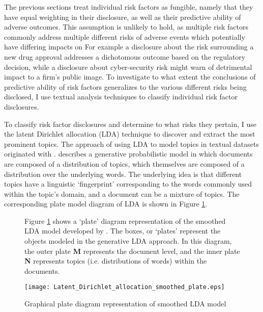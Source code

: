 The previous sections treat individual risk factors as fungible, namely that they have equal weighting in their disclosure, as well as their predictive ability of adverse outcomes.
This assumption is unlikely to hold, as multiple risk factors commonly address multiple different risks of adverse events which potentially have differing impacts on 
For example a disclosure about the risk surrounding a new drug approval addresses a dichotomous outcome based on the regulatory decision, while a disclosure about cyber-security risk might warn of detrimental impact to a firm's public image.
To investigate to what extent the conclusions of predictive ability of risk factors generalizes to the various different risks being disclosed, I use textual analysis techniques to classify individual risk factor disclosures.


To classify risk factor disclosures and determine to what risks they pertain, I use the latent Dirichlet allocation (LDA) technique to discover and extract the most prominent topics.
The approach of using LDA to model topics in textual datasets originated with \cite{blei_2003}.
\cite{blei_2003} describes a generative probabilistic model in which documents are composed of a distribution of topics, which themselves are composed of a distribution over the underlying words.
The underlying idea is that different topics have a linguistic `fingerprint' corresponding to the words commonly used within the topic's domain, and a document can be a mixture of topics.
The corresponding plate model diagram of LDA is shown in Figure \ref{fig:lda_plate_smooth}. 

\begin{figure}[ht!]
	\caption{Graphical plate diagram representation of smoothed LDA model}
	\label{fig:lda_plate_smooth}
	
	Figure \ref{fig:lda_plate_smooth} shows a `plate' diagram representation of the smoothed LDA model developed by \cite{blei_2003}.
	The boxes, or `plates' represent the objects modeled in the generative LDA approach.
	In this diagram, the outer plate \textbf{M} represents the document level, and the inner plate \textbf{N} represents topics (i.e. distributions of words) within the documents.
	
	\skipline
	\centering
	\texttt{[image: Latent\_Dirichlet\_allocation\_smoothed\_plate.eps]}
\end{figure}


